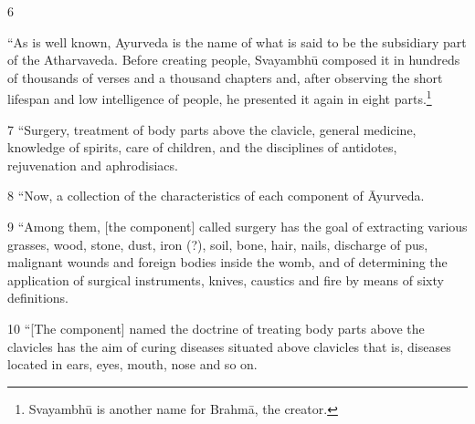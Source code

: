 \begin{translation}
    
    \item[6] 
    
    “As is well known, Ayurveda is the name of what is said to be the subsidiary
    part of the Atharvaveda.   Before creating people, Svayambhū composed it in
    hundreds of thousands of verses and a thousand chapters and, after observing the
    short lifespan and low intelligence of people, he presented it again in eight
    parts.\footnote{Svayambhū is another name for Brahmā, the creator.}
    
    \item[7] “Surgery, treatment of body parts above the clavicle, general medicine, 
    knowledge of spirits, care of children, and the disciplines of antidotes, rejuvenation 
    and aphrodisiacs.
    
    \item[8] “Now,  a collection of the characteristics of each component of 
    Āyurveda.
    
    \item[9] “Among them, [the component] called surgery has the goal of 
    extracting 
    various grasses, wood, stone, dust, iron (?), soil, bone, hair, nails, discharge of 
    pus, malignant wounds and foreign bodies inside the womb, and of determining 
    the application of surgical instruments, knives, caustics and fire by means of 
    sixty definitions.
    
    \item[10] “[The component] named the doctrine of treating body parts above 
    the clavicles has the aim of curing diseases situated above clavicles that is,  
    diseases located in ears, eyes, mouth, nose and so on.
    

\end{translation}

